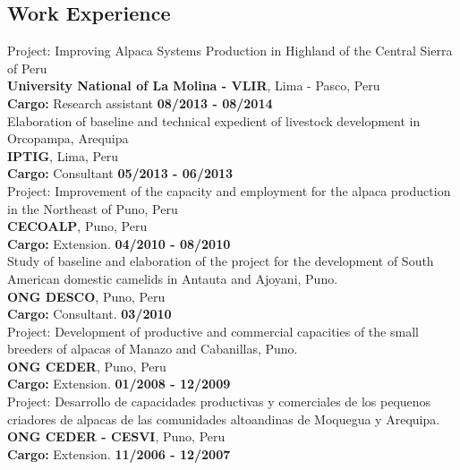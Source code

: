 \documentclass[margin,line,10pt]{res}
\begin{document}
\begin{resume}
\section{\sc Work \phantom{1cm} Experience}

Project: Improving Alpaca  Systems Production in Highland of the Central Sierra of Peru\\
{\bf University National of La Molina - VLIR}, Lima - Pasco, Peru\\
\vspace{-.3cm}
\textbf{Cargo:} Research assistant \hfill {\bf 08/2013 - 08/2014}\\

Elaboration of baseline and technical expedient of livestock development in Orcopampa, Arequipa\\
{\bf IPTIG}, Lima, Peru\\
\vspace{-.3cm}
\textbf{Cargo:} Consultant  \hfill {\bf 05/2013 - 06/2013}\\

Project: Improvement of the capacity and employment for the alpaca production in the Northeast of Puno, Peru\\
{\bf CECOALP}, Puno, Peru\\
\vspace{-.3cm}
\textbf{Cargo:} Extension.  \hfill {\bf 04/2010 - 08/2010}\\

Study of baseline and elaboration of the project for the development of South American domestic camelids in Antauta and Ajoyani, Puno.\\
{\bf ONG DESCO}, Puno, Peru\\
\vspace{-.3cm}
\textbf{Cargo:} Consultant.  \hfill {\bf 03/2010}\\

Project: Development of productive and commercial capacities of the small breeders of alpacas of Manazo and Cabanillas, Puno.\\
{\bf ONG CEDER}, Puno, Peru\\
\vspace{-.3cm}
\textbf{Cargo:} Extension.  \hfill {\bf 01/2008 - 12/2009}\\

Project: Desarrollo de capacidades productivas y comerciales de los pequenos criadores de alpacas de las comunidades altoandinas de Moquegua y Arequipa.\\
{\bf ONG CEDER - CESVI}, Puno, Peru\\
\vspace{-.3cm}
\textbf{Cargo:} Extension.  \hfill {\bf 11/2006 - 12/2007}\\


\end{resume}
\end{document}
